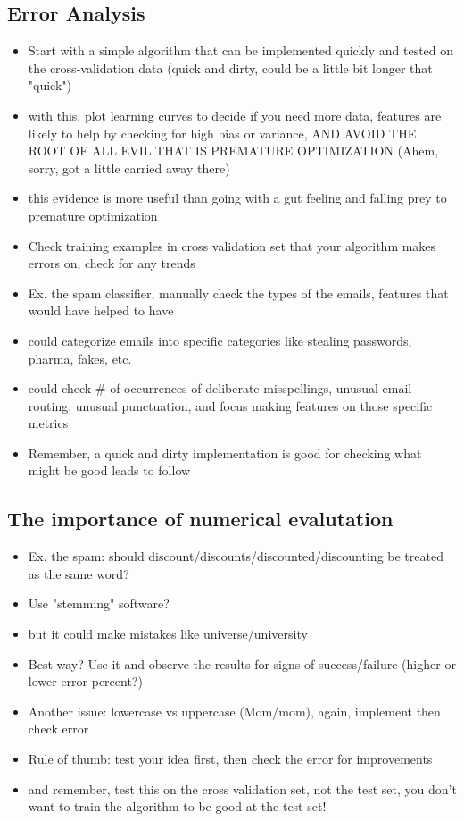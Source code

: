 \documentclass[]{article}
\begin{document}
	\subsection{Error Analysis}
		\begin{itemize}
			\item Start with a simple algorithm that can be implemented quickly and tested on the cross-validation data (quick and dirty, could be a little bit longer that "quick")
			\item with this, plot learning curves to decide if you need more data, features are likely to help by checking for high bias or variance, AND AVOID THE ROOT OF ALL EVIL THAT IS PREMATURE OPTIMIZATION (Ahem, sorry, got a little carried away there)
			\item this evidence is more useful than going with a gut feeling and falling prey to premature optimization
			\item Check  training examples in cross validation set that your algorithm makes errors on, check for any trends
			\item Ex. the spam classifier, manually check the types of the emails, features that would have helped to have
			\item could categorize emails into specific categories like stealing passwords, pharma, fakes, etc.
			\item could check \# of occurrences of deliberate misspellings, unusual email routing, unusual punctuation, and focus making features on those specific metrics
			\item Remember, a quick and dirty implementation is good for checking what might be good leads to follow
		\end{itemize}
		
	\subsection{The importance of numerical evalutation}
		\begin{itemize}
			\item Ex. the spam: should discount/discounts/discounted/discounting be treated as the same word?
			\item Use "stemming" software?
			\item but it could make mistakes like universe/university
			\item Best way? Use it and observe the results for signs of success/failure (higher or lower error percent?)
			\item Another issue: lowercase vs uppercase (Mom/mom), again, implement then check error
			\item Rule of thumb: test your idea first, then check the error for improvements
			\item and remember, test this on the cross validation set, not the test set, you don't want to train the algorithm to be good at the test set!
		\end{itemize}
		
\end{document}
